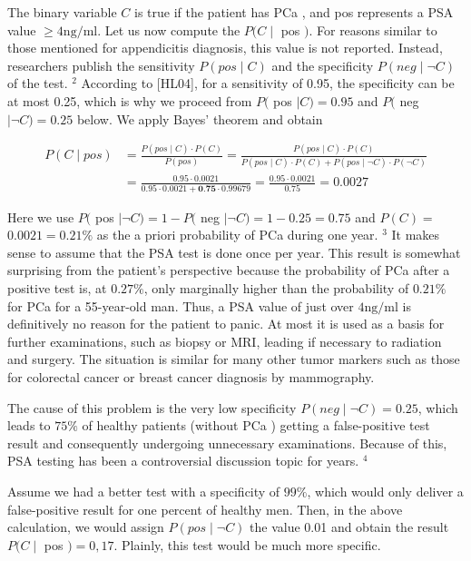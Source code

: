 \documentclass[10pt]{article}
\begin{document}
The binary variable $C$ is true if the patient has PCa , and pos represents a PSA value $\geq 4 \mathrm{ng} / \mathrm{ml}$. Let us now compute the $P(C \mid$ pos $)$. For reasons similar to those mentioned for appendicitis diagnosis, this value is not reported. Instead, researchers publish the sensitivity $P(p o s \mid C)$ and the specificity $P(n e g \mid \neg C)$ of the test. ${ }^{2}$ According to [HL04], for a sensitivity of 0.95, the specificity can be at most 0.25, which is why we proceed from $P($ pos $\mid C)=0.95$ and $P($ neg $\mid \neg C)=0.25$ below. We apply Bayes' theorem and obtain


$$
\begin{aligned}
P(C \mid p o s) & =\frac{P(p o s \mid C) \cdot P(C)}{P(p o s)}=\frac{P(p o s \mid C) \cdot P(C)}{P(p o s \mid C) \cdot P(C)+P(p o s \mid \neg C) \cdot P(\neg C)} \\
& =\frac{0.95 \cdot 0.0021}{0.95 \cdot 0.0021+\mathbf{0 . 7 5} \cdot 0.99679}=\frac{0.95 \cdot 0.0021}{0.75}=0.0027
\end{aligned}
$$

Here we use $P($ pos $\mid \neg C)=1-P($ neg $\mid \neg C)=1-0.25=0.75$ and $P(C)=$ $0.0021=0.21 \%$ as the a priori probability of PCa during one year. ${ }^{3}$ It makes sense to assume that the PSA test is done once per year. This result is somewhat surprising from the patient's perspective because the probability of PCa after a positive test is, at $0.27 \%$, only marginally higher than the probability of $0.21 \%$ for PCa for a 55-year-old man. Thus, a PSA value of just over $4 \mathrm{ng} / \mathrm{ml}$ is definitively no reason for the patient to panic. At most it is used as a basis for further examinations, such as biopsy or MRI, leading if necessary to radiation and surgery. The situation is similar for many other tumor markers such as those for colorectal cancer or breast cancer diagnosis by mammography.

The cause of this problem is the very low specificity $P(n e g \mid \neg C)=0.25$, which leads to $75 \%$ of healthy patients (without PCa ) getting a false-positive test result and consequently undergoing unnecessary examinations. Because of this, PSA testing has been a controversial discussion topic for years. ${ }^{4}$

Assume we had a better test with a specificity of $99 \%$, which would only deliver a false-positive result for one percent of healthy men. Then, in the above calculation, we would assign $P(p o s \mid \neg C)$ the value 0.01 and obtain the result $P(C \mid$ pos $)=0,17$. Plainly, this test would be much more specific.
\end{document}
